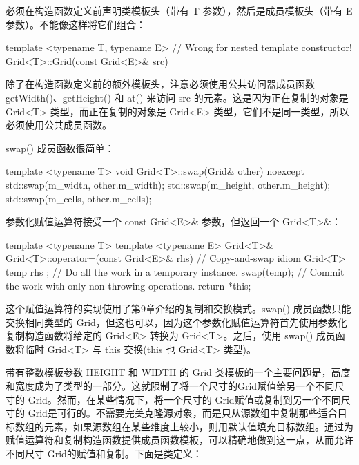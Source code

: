 必须在构造函数定义前声明类模板头（带有 T 参数），然后是成员模板头（带有 E 参数）。不能像这样将它们组合：

\begin{cpp}
template <typename T, typename E> // Wrong for nested template constructor!
Grid<T>::Grid(const Grid<E>& src)
\end{cpp}

除了在构造函数定义前的额外模板头，注意必须使用公共访问器成员函数 getWidth()、getHeight() 和 at() 来访问 src 的元素。这是因为正在复制的对象是 Grid<T> 类型，而正在复制的对象是 Grid<E> 类型，它们不是同一类型，所以必须使用公共成员函数。

swap() 成员函数很简单：

\begin{cpp}
template <typename T>
void Grid<T>::swap(Grid& other) noexcept
{
    std::swap(m_width, other.m_width);
    std::swap(m_height, other.m_height);
    std::swap(m_cells, other.m_cells);
}
\end{cpp}

参数化赋值运算符接受一个 const Grid<E>\& 参数，但返回一个 Grid<T>\&：

\begin{cpp}
template <typename T>
template <typename E>
Grid<T>& Grid<T>::operator=(const Grid<E>& rhs)
{
    // Copy-and-swap idiom
    Grid<T> temp { rhs }; // Do all the work in a temporary instance.
    swap(temp); // Commit the work with only non-throwing operations.
    return *this;
}
\end{cpp}

这个赋值运算符的实现使用了第9章介绍的复制和交换模式。swap() 成员函数只能交换相同类型的 Grid，但这也可以，因为这个参数化赋值运算符首先使用参数化复制构造函数将给定的 Grid<E> 转换为 Grid<T>。之后，使用 swap() 成员函数将临时 Grid<T> 与 this 交换(this 也 Grid<T> 类型)。


带有整数模板参数 HEIGHT 和 WIDTH 的 Grid 类模板的一个主要问题是，高度和宽度成为了类型的一部分。这就限制了将一个尺寸的Grid赋值给另一个不同尺寸的 Grid。然而，在某些情况下，将一个尺寸的 Grid赋值或复制到另一个不同尺寸的 Grid是可行的。不需要完美克隆源对象，而是只从源数组中复制那些适合目标数组的元素，如果源数组在某些维度上较小，则用默认值填充目标数组。通过为赋值运算符和复制构造函数提供成员函数模板，可以精确地做到这一点，从而允许不同尺寸 Grid的赋值和复制。下面是类定义：


